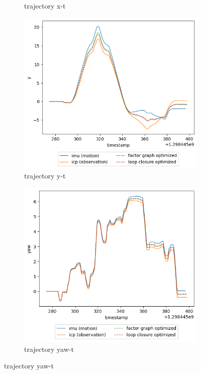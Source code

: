 \documentclass[conference]{IEEEtran}
\begin{document}
\begin{figure}
\begin{subfigure}{0.24\textwidth}
        \caption{trajectory x-t}
        \label{fig:trj_20_x}
    \end{subfigure}
    \hfill
    \begin{subfigure}{0.24\textwidth}
        \includegraphics[width=\linewidth]{../img/trj_20_y.png}
        \caption{trajectory y-t}
        \label{fig:trj_20_y}
    \end{subfigure}
    \hfill
    \begin{subfigure}{0.24\textwidth}
        \includegraphics[width=\linewidth]{../img/trj_20_yaw.png}
        \caption{trajectory yaw-t}
        \label{fig:trj_20_yaw}
    \end{subfigure}
    

\end{figure}
\end{document}

